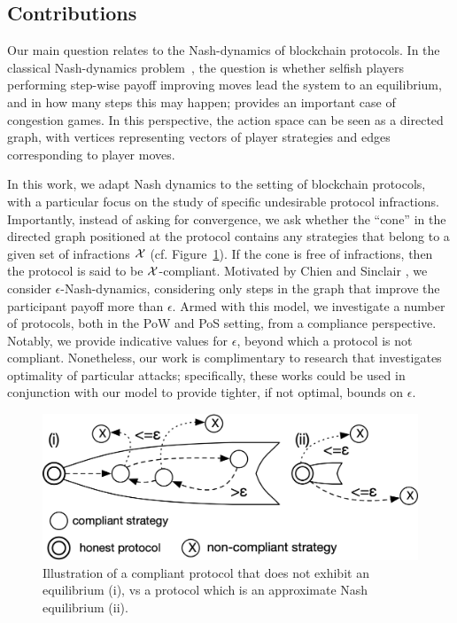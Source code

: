 \subsection*{Contributions}
Our main question relates to the Nash-dynamics of blockchain
protocols. In the classical Nash-dynamics problem~\cite{rosenthal73}, the
question is whether selfish players performing step-wise payoff improving moves
lead the system to an equilibrium, and in how many steps this may happen; \eg
\cite{DBLP:conf/stoc/FabrikantPT04} provides an important case of congestion
games. In this perspective, the action space can be seen as a directed graph,
with vertices representing vectors of player strategies and edges corresponding
to player moves.

In this work, we adapt Nash dynamics to the setting of blockchain protocols,
with a particular focus on the study of specific undesirable protocol
infractions.  Importantly, instead of asking for convergence, we ask whether
the ``cone'' in the directed graph positioned at the protocol contains any
strategies that belong to a given set of infractions $\mathcal{X}$
(cf. Figure~\ref{fig:cone}). If the cone is free of infractions, then the
protocol is said to be $\mathcal{X}$-compliant. Motivated by Chien and
Sinclair \cite{DBLP:journals/geb/ChienS11}, we consider
$\epsilon$-Nash-dynamics, \ie considering only steps in the graph that improve
the participant payoff more than $\epsilon$. Armed with this model, we
investigate a number of protocols, both in the PoW and PoS setting, from a
compliance perspective.
Notably, we provide indicative values for $\epsilon$,
beyond which a protocol is not compliant. Nonetheless, our work is
complimentary to research that investigates optimality of particular attacks;
specifically, these works could be used in conjunction with our model to
provide tighter, if not optimal, bounds on $\epsilon$.

\begin{figure}[h]
    \begin{center}
        \includegraphics[width=0.8\columnwidth]{figures/compliance/cone.png}
    \end{center}
    \caption{
        Illustration of a compliant protocol that does not exhibit an
        equilibrium (i), vs a protocol which is an approximate Nash equilibrium
        (ii).
    }
    \label{fig:cone}
\end{figure}

